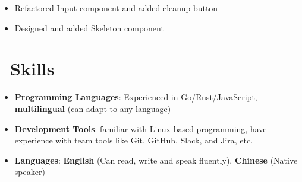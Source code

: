 \documentclass{resume}
\newcommand{\en}[1]{#1}
\newcommand{\zh}[1]{}
\begin{document}
\en{}
\zh{\role{前维护者}{\href{https://github.com/ant-design/ant-design/commits?author=hi-rustin}{24+ 个提交}}}
\begin{itemize}
      \item \en{Refactored Input component and added cleanup button}
            \zh{重构了 Input 组件，添加清理按钮}
      \item \en{Designed and added Skeleton component}
            \zh{设计并添加了 Skeleton 组件}
\end{itemize}

\section{\faCogs\ \en{Skills}\zh{技能}}
\begin{itemize}[parsep=0.25ex]
      \item \en{\textbf{Programming Languages}:
                  Experienced in Go/Rust/JavaScript,
                  \textbf{multilingual} (can adapt to any language)}
            \zh{\textbf{编程语言}:
                  熟悉 Go/Rust/JavaScript，
                  \textbf{泛语言}（编程不受特定语言限制）}

      \item \en{\textbf{Development Tools}:
                  familiar with Linux-based programming,
                  have experience with team tools like Git, GitHub, Slack, and Jira, etc.}
            \zh{\textbf{开发工具}:
                  熟悉 Linux，有 Git、GitHub、Slack 和 Jira 等团队协作工具的使用经验}

      \item \en{\textbf{Languages}:
                  \textbf{English} (Can read, write and speak fluently),
                  \textbf{Chinese} (Native speaker)}
            \zh{\textbf{语言}:
                  \textbf{英语} （可以流利的听说读写），
                  \textbf{中文} （母语）}
\end{itemize}
\end{document}
